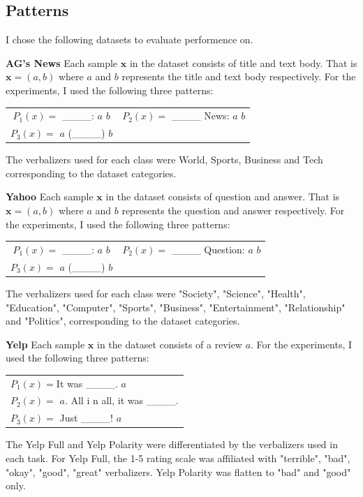 \documentclass[11pt,a4paper]{article}
\begin{document}
\subsection{Patterns}
\label{apx:patterns}
I chose the following datasets to evaluate performence on.

\vspace{8pt}
\noindent \textbf{AG's News} \quad
Each sample $\textbf{x}$ in the dataset consists of title and text body.
That is $\textbf{x}=(a, b)$ where $a$ and $b$ represents the title and text body respectively.
For the experiments, I used the following three patterns:
\begin{table}[H]
	\renewcommand{\arraystretch}{1.5}
	\begin{tabularx}{\textwidth}{cc}
		 $P_1(x)=$ \_\_\_\_: $a$ $b$ & $P_2(x)=$ \_\_\_\_ News: $a$ $b$ \\
		 $P_3(x)=$ $a$ (\_\_\_\_) $b$ &  \\
	\end{tabularx}
\end{table}
The verbalizers used for each class were World, Sports, Business and Tech corresponding to the dataset categories.

\vspace{8pt}
\noindent \textbf{Yahoo} \quad
Each sample $\textbf{x}$ in the dataset consists of question and answer.
That is $\textbf{x}=(a, b)$ where $a$ and $b$ represents the question and answer respectively.
For the experiments, I used the following three patterns:
\begin{table}[H]
	\renewcommand{\arraystretch}{1.5}
	\begin{tabularx}{\textwidth}{cc}
		$P_1(x)=$ \_\_\_\_: $a$ $b$ & $P_2(x)=$ \_\_\_\_ Question: $a$ $b$ \\
		$P_3(x)=$ $a$ (\_\_\_\_) $b$ &  \\
	\end{tabularx}
\end{table}
The verbalizers used for each class were "Society", "Science", "Health", "Education", "Computer", "Sports", "Business", "Entertainment", "Relationship" and "Politics", corresponding to the dataset categories.

\vspace{8pt}
\noindent \textbf{Yelp} \quad
Each sample $\textbf{x}$ in the dataset consists of a review $a$.
For the experiments, I used the following three patterns:
\begin{table}[H]
	\renewcommand{\arraystretch}{1.5}
	\begin{tabularx}{\textwidth}{l}
		$P_1(x)=$It was \_\_\_\_. $a$ \\
		$P_2(x)=$ $a$. All i n all, it was \_\_\_\_. \\
		$P_3(x)=$ Just \_\_\_\_! $a$  \\
	\end{tabularx}
\end{table}
The Yelp Full and Yelp Polarity were differentiated by the verbalizers used in each task.
For Yelp Full, the 1-5 rating scale was affiliated with "terrible", "bad", "okay", "good", "great" verbalizers.
Yelp Polarity was flatten to "bad" and "good" only.
\end{document}
